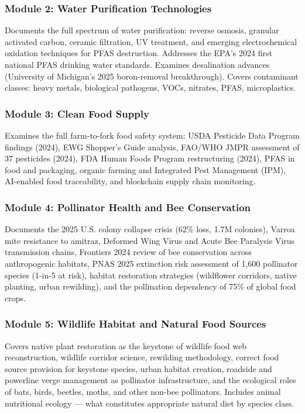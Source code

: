 \documentclass[11pt,letterpaper]{article}
\begin{document}
\subsubsection{Module 2: Water Purification Technologies}
Documents the full spectrum of water purification: reverse osmosis, granular activated carbon, ceramic filtration, UV treatment, and emerging electrochemical oxidation techniques for PFAS destruction. Addresses the EPA's 2024 first national PFAS drinking water standards. Examines desalination advances (University of Michigan's 2025 boron-removal breakthrough). Covers contaminant classes: heavy metals, biological pathogens, VOCs, nitrates, PFAS, microplastics.

\subsubsection{Module 3: Clean Food Supply}
Examines the full farm-to-fork food safety system: USDA Pesticide Data Program findings (2024), EWG Shopper's Guide analysis, FAO/WHO JMPR assessment of 37 pesticides (2024), FDA Human Foods Program restructuring (2024), PFAS in food and packaging, organic farming and Integrated Pest Management (IPM), AI-enabled food traceability, and blockchain supply chain monitoring.

\subsubsection{Module 4: Pollinator Health and Bee Conservation}
Documents the 2025 U.S. colony collapse crisis (62\% loss, 1.7M colonies), Varroa mite resistance to amitraz, Deformed Wing Virus and Acute Bee Paralysis Virus transmission chains, Frontiers 2024 review of bee conservation across anthropogenic habitats, PNAS 2025 extinction risk assessment of 1,600 pollinator species (1-in-5 at risk), habitat restoration strategies (wildflower corridors, native planting, urban rewilding), and the pollination dependency of 75\% of global food crops.

\subsubsection{Module 5: Wildlife Habitat and Natural Food Sources}
Covers native plant restoration as the keystone of wildlife food web reconstruction, wildlife corridor science, rewilding methodology, correct food source provision for keystone species, urban habitat creation, roadside and powerline verge management as pollinator infrastructure, and the ecological roles of bats, birds, beetles, moths, and other non-bee pollinators. Includes animal nutritional ecology --- what constitutes appropriate natural diet by species class.
\end{document}
